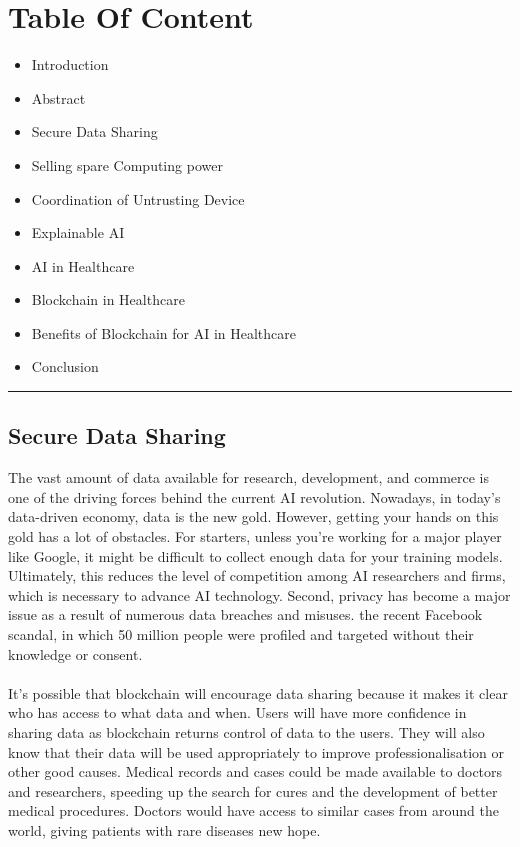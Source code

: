 \documentclass[12pt,letterpaper]{article}
\begin{document}
\section* {Table Of Content}
  \begin{itemize}
    \item Introduction
    \item Abstract
    \item Secure Data Sharing
    \item Selling spare Computing power
    \item Coordination of Untrusting Device
    \item Explainable AI
    \item AI in Healthcare 
    \item Blockchain in Healthcare
    \item Benefits of Blockchain for AI in Healthcare
    \item Conclusion
  \end{itemize}

  \rule{\textwidth}{0.1pt}

  \subsection* {Secure Data Sharing}

  The vast amount of data available for research, development, and commerce is one of the driving forces behind the current AI revolution. Nowadays, in today's data-driven economy, data is the new gold. However, getting your hands on this gold has a lot of obstacles. For starters, unless you're working for a major player like Google, it might be difficult to collect enough data for your training models. Ultimately, this reduces the level of competition among AI researchers and firms, which is necessary to advance AI technology. Second, privacy has become a major issue as a result of numerous data breaches and misuses. the recent Facebook scandal, in which 50 million people were profiled and targeted without their knowledge or consent.
  \\
  \\
  It's possible that blockchain will encourage data sharing because it makes it clear who has access to what data and when. Users will have more confidence in sharing data as blockchain returns control of data to the users. They will also know that their data will be used appropriately to improve professionalisation or other good causes. Medical records and cases could be made available to doctors and researchers, speeding up the search for cures and the development of better medical procedures. Doctors would have access to similar cases from around the world, giving patients with rare diseases new hope.
\end{document}
